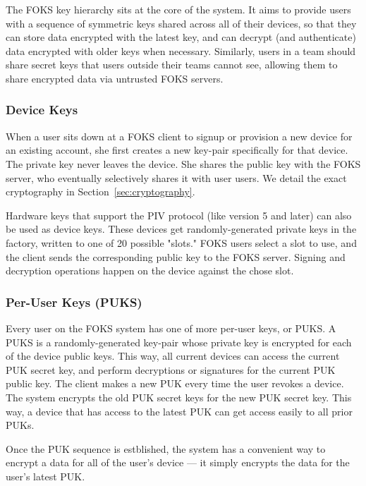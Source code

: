The FOKS key hierarchy sits at the core of the system. It aims to provide users
with a sequence of symmetric keys shared across all of their devices, so that
they can store data encrypted with the latest key, and can decrypt (and
authenticate) data encrypted with older keys when necessary. Similarly, users in
a team should share secret keys that users outside their teams cannot see, allowing
them to share encrypted data via untrusted FOKS servers.

\subsubsection{Device Keys}

When a user sits down at a FOKS client to signup or provision a new device
for an existing account, she first creates a new key-pair specifically
for that device. The private key never leaves the device. She shares the public key
with the FOKS server, who eventually selectively shares it with user users.
We detail the exact cryptography in Section~\ref{sec:cryptography}.

Hardware keys that support the PIV protocol (like \yubi{} version 5 and later)
can also be used as device keys. These devices get randomly-generated private
keys in the factory, written to one of 20 possible "slots." FOKS users select
a slot to use, and the client sends the corresponding public key to the FOKS 
server. Signing and decryption operations happen on the device against the chose
slot. 

\subsubsection{Per-User Keys (PUKS)}

Every user on the FOKS system has one of more per-user keys, or PUKS. A PUKS
is a randomly-generated key-pair whose private key is encrypted for each of
the device public keys. This way, all current devices can access the current
PUK secret key, and perform decryptions or signatures for the current PUK public
key. The client makes a new PUK every time the user revokes a device. The system
encrypts the old PUK secret keys for the new PUK secret key. This way,
a device that has access to the latest PUK can get access easily to all prior
PUKs.

Once the PUK sequence is estblished, the system has a convenient way to encrypt
a data for all of the user's device --- it simply encrypts the data for the 
user's latest PUK.

